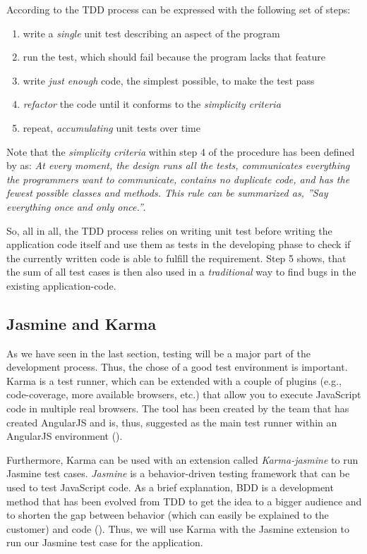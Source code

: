 According to \cite{GAA2015} the \ac{TDD} process can be expressed with the following set of steps:

\begin{enumerate}
  	\item write a \emph{single} unit test describing an aspect of the program
  	\item run the test, which should fail because the program lacks that feature
  	\item write \emph{just enough} code, the simplest possible, to make the test pass
	\item \emph{refactor} the code until it conforms to the \textit{simplicity criteria}
	\item repeat, \emph{accumulating} unit tests over time
\end{enumerate}

Note that the \textit{simplicity criteria} within step 4 of the procedure has been defined by \cite{Beck1999} as: \textit{At every moment, the design runs all the tests, communicates everything the programmers want to communicate, contains no duplicate code, and has the fewest possible classes and methods. This rule can be summarized as, ''Say everything once and only once.''}. 

So, all in all, the \ac{TDD} process relies on writing unit test before writing the application code itself and use them as tests in the developing phase to check if the currently written code is able to fulfill the requirement. Step 5 shows, that the sum of all test cases is then also used in a \textit{traditional} way to find bugs in the existing application-code. 

\subsection{Jasmine and Karma}
As we have seen in the last section, testing will be a major part of the development process. Thus, the chose of a good test environment is important. Karma is a test runner, which can be extended with a couple of plugins (e.g., code-coverage, more available browsers, etc.) that allow you to execute JavaScript code in multiple real browsers. The tool has been created by the team that has created AngularJS and is, thus, suggested as the main test runner within an AngularJS environment (\cite{7_github_2015}).  

Furthermore, Karma can be used with an extension called \emph{Karma-jasmine} to run Jasmine test cases. \emph{Jasmine} is a behavior-driven testing framework that can be used to test JavaScript code. As a brief explanation, \ac{BDD} is a development method that has been evolved from \ac{TDD} to get the idea to a bigger audience and to shorten the gap between behavior (which can easily be explained to the customer) and code (\cite{BDD}). Thus, we will use Karma with the Jasmine extension to run our Jasmine test case for the application.
 
